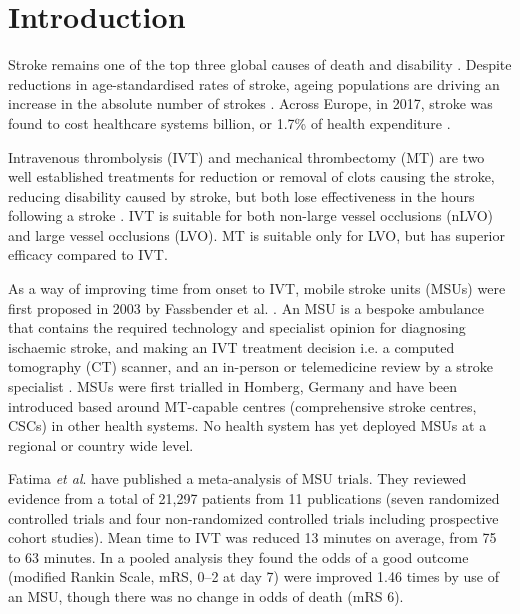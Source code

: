 \section{Introduction}


Stroke remains one of the top three global causes of death and disability \cite{feigin_global_2021}. Despite reductions in age-standardised rates of stroke, ageing populations are driving an increase in the absolute number of strokes \cite{feigin_global_2021}. Across Europe, in 2017, stroke was found to cost healthcare systems  billion, or 1.7\% of health expenditure \cite{luengo-fernandez_economic_2020}.

Intravenous thrombolysis (IVT) and mechanical thrombectomy (MT) are two well established treatments for reduction or removal of clots causing the stroke, reducing disability caused by stroke, but both lose effectiveness in the hours following a stroke \cite{emberson_effect_2014, fransen_time_2016}. IVT is suitable for both non-large vessel occlusions (nLVO) and large vessel occlusions (LVO). MT is suitable only for LVO, but has superior efficacy compared to IVT.


As a way of improving time from onset to IVT, mobile stroke units (MSUs) were first proposed in 2003 by Fassbender et al. \cite{fassbender_mobile_2003}. An MSU is a bespoke ambulance that contains the required technology and specialist opinion for diagnosing ischaemic stroke, and making an IVT treatment decision i.e. a computed tomography (CT) scanner, and an in-person or telemedicine review by a stroke specialist \cite{taqui_reduction_2017}. MSUs were first trialled in Homberg, Germany \cite{walter_diagnosis_2012} and have been introduced based around MT-capable centres (comprehensive stroke centres, CSCs)  in other health systems. No health system has yet deployed MSUs at a regional or country wide level.

Fatima \textit{et al}. \cite{fatima_mobile_2020} have published a meta-analysis of MSU trials. They reviewed evidence from a total of 21,297 patients from 11 publications (seven randomized controlled trials and four non-randomized controlled trials including prospective cohort studies). Mean time to IVT was reduced 13 minutes on average, from 75 to 63 minutes. In a pooled analysis they found the odds of a good outcome (modified Rankin Scale, mRS, 0–2 at day 7) were improved 1.46 times by use of an MSU, though there was no change in odds of death (mRS 6).

